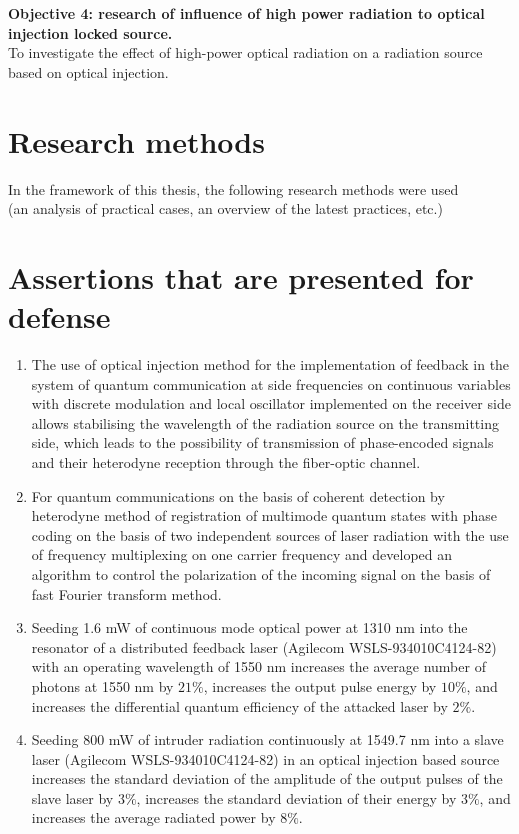 \textbf{Objective 4: research of influence of high power radiation to optical injection locked source.}\\
To investigate the effect of high-power optical radiation on a radiation source based on optical injection.
\section*{Research methods}
In the framework of this thesis, the following research methods were used\\
(an analysis of practical cases, an overview of the latest practices, etc.)

\section*{Assertions that are presented for defense}
\begin{enumerate}
    \item The use of optical injection method for the implementation of feedback in the system of quantum communication at side frequencies on continuous variables with discrete modulation and local oscillator implemented on the receiver side allows stabilising the wavelength of the radiation source on the transmitting side, which leads to the possibility of transmission of phase-encoded signals and their heterodyne reception through the fiber-optic channel.
    \item For quantum communications on the basis of coherent detection by heterodyne method of registration of multimode quantum states with phase coding on the basis of two independent sources of laser radiation with the use of frequency multiplexing on one carrier frequency and developed an algorithm to control the polarization of the incoming signal on the basis of fast Fourier transform method. 
    \item Seeding 1.6 mW of continuous mode optical power at 1310 nm into the resonator of a distributed feedback laser (Agilecom WSLS-934010C4124-82) with an operating wavelength of 1550 nm increases the average number of photons at 1550 nm by $21\%$, increases the output pulse energy by $10\%$, and increases the differential quantum efficiency of the attacked laser by $2\%$.
    \item Seeding 800 mW of intruder radiation continuously at 1549.7 nm into a slave laser (Agilecom WSLS-934010C4124-82) in an optical injection based source increases the standard deviation of the amplitude of the output pulses of the slave laser by $3\%$, increases the standard deviation of their energy by $3\%$, and increases the average radiated power by $8\%$.
\end{enumerate}



